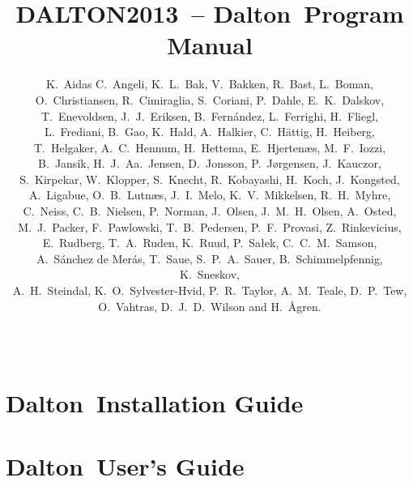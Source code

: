 \documentclass[11pt]{report}
\newcommand{\latestrelease}{DALTON2013}
\newcommand{\dalton}{{\sc Dalton}}
\begin{document}
\nobibliography*
%
%
\baselineskip=15pt
%
\title{\latestrelease\ -- \dalton\ Program Manual}

%
\author{
K.~Aidas
C.~Angeli,
K.~L.~Bak,
V.~Bakken,
R.~Bast,
L.~Boman,\\
O.~Christiansen,
R.~Cimiraglia,
S.~Coriani,
P.~Dahle,
E.~K.~Dalskov,\\
T.~Enevoldsen,
J.~J.~Eriksen,
B.~Fern\'{a}ndez,
L.~Ferrighi,
H.~Fliegl,\\
L.~Frediani,
B.~Gao,
K.~Hald,
A.~Halkier,
C.~H{\"a}ttig,
H.~Heiberg,\\
T.~Helgaker,
A.~C.~Hennum,
H.~Hettema,
E.~Hjerten\ae{}s,
M.~F.~Iozzi,\\
B.~Jansik,
H.~J.~Aa.~Jensen,
D.~Jonsson,
P.~J{\o}rgensen,
J.~Kauczor,\\
S.~Kirpekar,
W.~Klopper,
S.~Knecht,
R.~Kobayashi,
H.~Koch,
J.~Kongsted,\\
A.~Ligabue,
O.~B.~Lutn\ae{}s,
J.~I.~Melo,
K.~V.~Mikkelsen,
R.~H.~Myhre,\\
C.~Neiss,
C.~B.~Nielsen,
P.~Norman,
J.~Olsen,
J.~M.~H.~Olsen,
A.~Osted,\\
M.~J.~Packer,
F.~Pawlowski,
T.~B.~Pedersen,
P.~F.~Provasi,
Z.~Rinkevicius,\\
E.~Rudberg,
T.~A.~Ruden,
K.~Ruud,
P.~Sa\l{}ek,
C.~C.~M.~Samson,\\
A.~S\'{a}nchez de Mer\'{a}s,
T.~Saue,
S.~P.~A.~Sauer,
B.~Schimmelpfennig,
K.~Sneskov,\\
A.~H.~Steindal,
K.~O.~Sylvester-Hvid,
P.~R.~Taylor,
A.~M.~Teale,
D.~P.~Tew,\\
O.~Vahtras,
D.~J.~D.~Wilson
and H.~{\AA}gren.
}
%
\date{\mbox{\ }}
%
\maketitle
%



\part{\dalton\ Installation Guide}


\part{\dalton\ User's Guide}




















\end{document}
